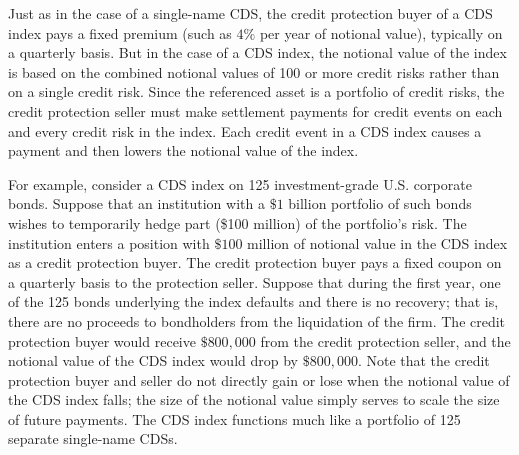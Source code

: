 \documentclass[11pt]{article}
\begin{document}
Just as in the case of a single-name CDS, the credit protection buyer of a CDS index pays a fixed premium (such as $4 \%$ per year of notional value), typically on a quarterly basis. But in the case of a CDS index, the notional value of the index is based on the combined notional values of 100 or more credit risks rather than on a single credit risk. Since the referenced asset is a portfolio of credit risks, the credit protection seller must make settlement payments for credit events on each and every credit risk in the index. Each credit event in a CDS index causes a payment and then lowers the notional value of the index.

For example, consider a CDS index on 125 investment-grade U.S. corporate bonds. Suppose that an institution with a $\$ 1$ billion portfolio of such bonds wishes to temporarily hedge part (\$100 million) of the portfolio's risk. The institution enters a position with $\$ 100$ million of notional value in the CDS index as a credit protection buyer. The credit protection buyer pays a fixed coupon on a quarterly basis to the protection seller. Suppose that during the first year, one of the 125 bonds underlying the index defaults and there is no recovery; that is, there are no proceeds to bondholders from the liquidation of the firm. The credit protection buyer would receive $\$ 800,000$ from the credit protection seller, and the notional value of the CDS index would drop by $\$ 800,000$. Note that the credit protection buyer and seller do not directly gain or lose when the notional value of the CDS index falls; the size of the notional value simply serves to scale the size of future payments. The CDS index functions much like a portfolio of 125 separate single-name CDSs.
\end{document}
